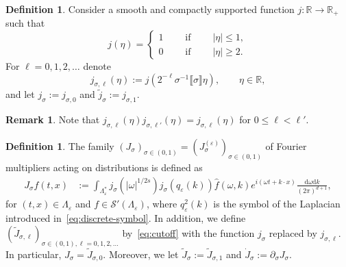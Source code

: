 \documentclass{article}
\numberwithin{equation}{section}
\newcommand{\assign}{:=}
\newcommand{\mathd}{\mathrm{d}}
\theoremstyle{plain}
\theoremstyle{definition}
\newtheorem{definition}[theorem]{Definition}
\newtheorem{remark}[theorem]{Remark}
\begin{document}
\begin{definition}
  \label{def:function-j}
  Consider a smooth and compactly supported function $j
  : \mathbb{R} \rightarrow \mathbb{R}_+$ such that
  \[ j (\eta) = \left\{ \begin{aligned}
       1 \qquad \operatorname{if} \qquad | \eta | \leqslant 1,\\
       0 \qquad \operatorname{if} \qquad | \eta | \geqslant 2.
     \end{aligned} \right. \]
  For $\ell = 0, 1, 2, \ldots$ denote
  \[ j_{\sigma, \ell} (\eta) \assign j (2^{- \ell} \sigma^{- 1}  \llbracket
     \sigma \rrbracket \eta), \qquad \eta \in \mathbb{R}, \]
  and let $j_{\sigma} \assign j_{\sigma, 0}$ and $\tilde{j}_{\sigma} \assign
  j_{\sigma, 1}$.
\end{definition}

\begin{remark}
  Note that $j_{\sigma, \ell} (\eta) j_{\sigma, \ell'} (\eta) = j_{\sigma,
  \ell} (\eta)$ for $0 \leqslant \ell < \ell'$.
\end{remark}

\begin{definition}
  The family $(J_{\sigma} )_{\sigma \in (0, 1)} =
  (J_{\sigma}^{(\varepsilon)})_{\sigma \in (0, 1)}$ of Fourier multipliers
  acting on distributions is defined as
  \begin{equation}
    \label{eq:cutoff}
    \begin{aligned}
      J_{\sigma}  f (t, x) &\assign
      \int_{\Lambda^{\ast}_{\varepsilon}} j_{\sigma} (| \omega |^{1 / 2 s})
      j_{\sigma} (q_{\varepsilon} (k))  \hat{f} (\omega, k) e^{i (\omega t + k
      \cdot x)}  \frac{\mathd \omega \mathd k}{(2 \pi)^{d + 1}},
    \end{aligned}
  \end{equation} for $(t, x) \in \Lambda_{\varepsilon}$ and 
  $f \in \mathcal{S}'(\Lambda_{\varepsilon})$,
  where $q_{\varepsilon}^2 (k)$ is the symbol of the Laplacian introduced
  in~\eqref{eq:discrete-symbol}. In addition, we define $(\tilde{J}_{\sigma,
  \ell})_{\sigma \in (0, 1), \ell = 0,1,2, \ldots}$ by~\eqref{eq:cutoff} with
  the function $j_{\sigma}$ replaced by $j_{\sigma, \ell}$. In particular, $J_\sigma=\tilde J_{\sigma,0}$. Moreover, we let
  $\tilde{J}_{\sigma}  \assign \tilde{J}_{\sigma, 1} $ and $\dot{J}_{\sigma}
  \assign \partial_{\sigma} J_{\sigma}$.
\end{definition}
\end{document}
